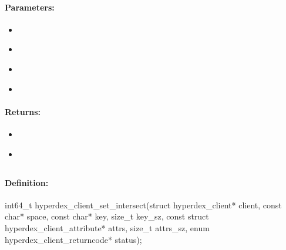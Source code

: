 \paragraph{Parameters:}
\begin{itemize}[noitemsep]
\item {}\\

\item {}\\

\item {}\\

\item {}\\

\end{itemize}

\paragraph{Returns:}
\begin{itemize}[noitemsep]
\item {}\\

\item {}\\

\end{itemize}

\pagebreak
\subsection{}
\label{api:c:set_intersect}


\paragraph{Definition:}
\begin{ccode}
int64_t hyperdex_client_set_intersect(struct hyperdex_client* client,
        const char* space,
        const char* key, size_t key_sz,
        const struct hyperdex_client_attribute* attrs, size_t attrs_sz,
        enum hyperdex_client_returncode* status);
\end{ccode}

